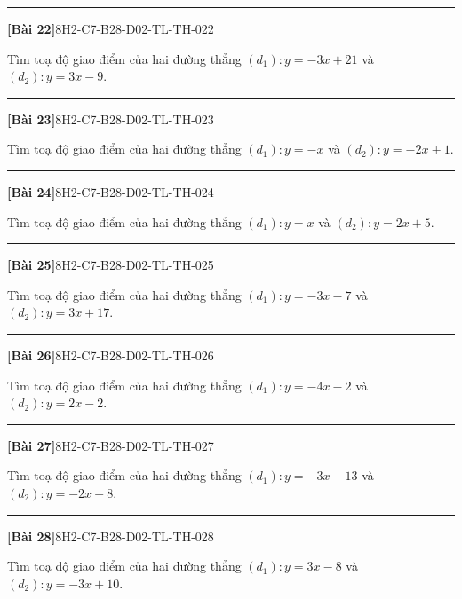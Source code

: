 \documentclass[12pt,a4paper]{article}
\newif\ifloigiai
\newenvironment{cauhoi}[2]{%
  \par\medskip\noindent\rule{\textwidth}{0.4pt}\par\nopagebreak
  \noindent\textbf{[#1]}\hfill{\scriptsize\ttfamily #2}\par\nopagebreak\smallskip}{\par}
\newcommand{\loigiai}[1]{\ifloigiai\par\smallskip\noindent\textit{Lời giải.} #1\par\fi}
\begin{document}
\begin{cauhoi}{Bài 22}{8H2-C7-B28-D02-TL-TH-022}
Tìm toạ độ giao điểm của hai đường thẳng $(d_1): y=-3x+21$ và $(d_2): y=3x-9$.
\loigiai{Hoành độ giao điểm là nghiệm của phương trình $-3x+21=3x-9$, suy ra $-6x=-30$ nên $x=5$. Thay vào $(d_1)$: $y=-3\cdot(5)+21=6$. Vậy giao điểm là $(5;6)$.}
\end{cauhoi}
\begin{cauhoi}{Bài 23}{8H2-C7-B28-D02-TL-TH-023}
Tìm toạ độ giao điểm của hai đường thẳng $(d_1): y=-x$ và $(d_2): y=-2x+1$.
\loigiai{Hoành độ giao điểm là nghiệm của phương trình $-x=-2x+1$, suy ra $x=1$ nên $x=1$. Thay vào $(d_1)$: $y=-1\cdot(1)+0=-1$. Vậy giao điểm là $(1;-1)$.}
\end{cauhoi}
\begin{cauhoi}{Bài 24}{8H2-C7-B28-D02-TL-TH-024}
Tìm toạ độ giao điểm của hai đường thẳng $(d_1): y=x$ và $(d_2): y=2x+5$.
\loigiai{Hoành độ giao điểm là nghiệm của phương trình $x=2x+5$, suy ra $-x=5$ nên $x=-5$. Thay vào $(d_1)$: $y=1\cdot(-5)+0=-5$. Vậy giao điểm là $(-5;-5)$.}
\end{cauhoi}
\begin{cauhoi}{Bài 25}{8H2-C7-B28-D02-TL-TH-025}
Tìm toạ độ giao điểm của hai đường thẳng $(d_1): y=-3x-7$ và $(d_2): y=3x+17$.
\loigiai{Hoành độ giao điểm là nghiệm của phương trình $-3x-7=3x+17$, suy ra $-6x=24$ nên $x=-4$. Thay vào $(d_1)$: $y=-3\cdot(-4)-7=5$. Vậy giao điểm là $(-4;5)$.}
\end{cauhoi}
\begin{cauhoi}{Bài 26}{8H2-C7-B28-D02-TL-TH-026}
Tìm toạ độ giao điểm của hai đường thẳng $(d_1): y=-4x-2$ và $(d_2): y=2x-2$.
\loigiai{Hoành độ giao điểm là nghiệm của phương trình $-4x-2=2x-2$, suy ra $-6x=0$ nên $x=0$. Thay vào $(d_1)$: $y=-4\cdot(0)-2=-2$. Vậy giao điểm là $(0;-2)$.}
\end{cauhoi}
\begin{cauhoi}{Bài 27}{8H2-C7-B28-D02-TL-TH-027}
Tìm toạ độ giao điểm của hai đường thẳng $(d_1): y=-3x-13$ và $(d_2): y=-2x-8$.
\loigiai{Hoành độ giao điểm là nghiệm của phương trình $-3x-13=-2x-8$, suy ra $-x=5$ nên $x=-5$. Thay vào $(d_1)$: $y=-3\cdot(-5)-13=2$. Vậy giao điểm là $(-5;2)$.}
\end{cauhoi}
\begin{cauhoi}{Bài 28}{8H2-C7-B28-D02-TL-TH-028}
Tìm toạ độ giao điểm của hai đường thẳng $(d_1): y=3x-8$ và $(d_2): y=-3x+10$.
\loigiai{Hoành độ giao điểm là nghiệm của phương trình $3x-8=-3x+10$, suy ra $6x=18$ nên $x=3$. Thay vào $(d_1)$: $y=3\cdot(3)-8=1$. Vậy giao điểm là $(3;1)$.}
\end{cauhoi}
\end{document}
